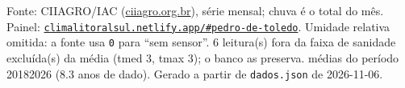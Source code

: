 \documentclass[10pt,a4paper]{article}
\begin{document}
\vspace{1pt}
{\tiny\color{cinza}
Fonte: CIIAGRO/IAC (\href{http://ciiagro.org.br}{ciiagro.org.br}), série mensal;
chuva é o total do mês. Painel:
\href{https://climalitoralsul.netlify.app/\#pedro-de-toledo}%
{\texttt{climalitoralsul.netlify.app/\#pedro-de-toledo}}.
Umidade relativa omitida: a fonte usa \texttt{0} para ``sem sensor''.  6 leitura(s) fora da faixa de sanidade excluída(s) da média (tmed 3, tmax 3); o banco as preserva.
médias do período 2018\textendash{}2026 (8.3 anos de dado).
Gerado a partir de \texttt{dados.json} de 2026-11-06.}
\end{document}
